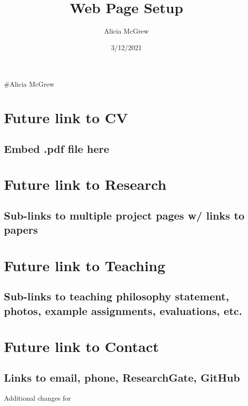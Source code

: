 \documentclass[]{article}
\title{Web Page Setup}
\author{Alicia McGrew}
\date{3/12/2021}
\begin{document}
\maketitle

\#Alicia McGrew

\hypertarget{future-link-to-cv}{%
\section{Future link to CV}\label{future-link-to-cv}}

\hypertarget{embed-.pdf-file-here}{%
\subsection{Embed .pdf file here}\label{embed-.pdf-file-here}}

\hypertarget{future-link-to-research}{%
\section{Future link to Research}\label{future-link-to-research}}

\hypertarget{sub-links-to-multiple-project-pages-w-links-to-papers}{%
\subsection{Sub-links to multiple project pages w/ links to
papers}\label{sub-links-to-multiple-project-pages-w-links-to-papers}}

\hypertarget{future-link-to-teaching}{%
\section{Future link to Teaching}\label{future-link-to-teaching}}

\hypertarget{sub-links-to-teaching-philosophy-statement-photos-example-assignments-evaluations-etc.}{%
\subsection{Sub-links to teaching philosophy statement, photos, example
assignments, evaluations,
etc.}\label{sub-links-to-teaching-philosophy-statement-photos-example-assignments-evaluations-etc.}}

\hypertarget{future-link-to-contact}{%
\section{Future link to Contact}\label{future-link-to-contact}}

\hypertarget{links-to-email-phone-researchgate-github}{%
\subsection{Links to email, phone, ResearchGate,
GitHub}\label{links-to-email-phone-researchgate-github}}

Additional changes for
\end{document}
